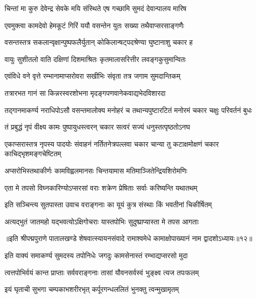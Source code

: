 \twolineshloka
{चिन्तां मा कुरु देवेन्द्र सेवके मयि संस्थिते}
{एष गच्छामि सुमदं देवान्पालय मारिष}%

\twolineshloka
{एवमुक्त्वा कामदेवो हेमकूटं गिरिं ययौ}
{वसन्तेन युतः सख्या तथैवाप्सरसाङ्गणैः}%

\twolineshloka
{वसन्तस्तत्र सकलान्वृक्षान्पुष्पफलैर्युतान्}
{कोकिलान्षट्पदश्रेण्या घुष्टानाशु चकार ह}%

\twolineshloka
{वायुः सुशीतलो वाति दक्षिणां दिशमाश्रितः}
{कृतमालासरित्तीर लवङ्गकुसुमान्वितः}%

\twolineshloka
{एवंविधे वने वृत्ते रम्भानामाप्सरोवरा}
{सखीभिः संवृता तत्र जगाम सुमदान्तिकम्}%

\twolineshloka
{तत्रारभत गानं सा किन्नरस्वरशोभना}
{मृदङ्गपणवानेकवाद्यभेदविशारदा}%

\fourlineindentedshloka
{तद्गानमाकर्ण्य नराधिपोऽसौ}
{वसन्तमालोक्य मनोहरं च}
{तथान्यपुष्टारटितं मनोरमं}
{चकार चक्षुः परिवर्तनं बुधः}%

\twolineshloka
{तं प्रबुद्धं नृपं वीक्ष्य कामः पुष्पायुधस्त्वरन्}
{चकार सत्वरं सज्यं धनुस्तत्पृष्ठतोऽनघ}%

\fourlineindentedshloka
{एकाप्सरास्तत्र नृपस्य पादयोः}
{संवाहनं नर्तितनेत्रपल्लवा}
{चकार चान्या तु कटाक्षमोक्षणं}
{चकार काचिद्भृशमङ्गचेष्टितम्}%

\twolineshloka
{अप्सरोभिस्तथाकीर्णः कामविह्वलमानसः}
{चिन्तयामास मतिमाञ्जितेन्द्रियशिरोमणिः}%

\twolineshloka
{एता मे तपसो विघ्नकारिण्योऽप्सरसां वराः}
{शक्रेण प्रेषिताः सर्वाः करिष्यन्ति यथातथम्}%

\twolineshloka
{इति सञ्चिन्त्य सुतपास्ता उवाच वराङ्गनाः}
{का यूयं कुत्र संस्थाः किं भवतीनां चिकीर्षितम्}%

\twolineshloka
{अत्यद्भुतं जातमहो यद्भवत्योऽक्षिगोचराः}
{यास्तपोभिः सुदुष्प्राप्यास्ता मे तपस आगताः}%

॥इति श्रीपद्मपुराणे पातालखण्डे शेषवात्स्यायनसंवादे रामाश्वमेधे कामाक्षोपाख्यानं नाम द्वादशोऽध्यायः॥१२॥



\twolineshloka
{इति वाक्यं समाकर्ण्य सुमदस्य तपोनिधेः}
{जगदुः कामसेनास्तं रम्भाद्यप्सरसो मुदा}%

\twolineshloka
{त्वत्तपोभिर्वयं कान्त प्राप्ताः सर्ववराङ्गनाः}
{तासां यौवनसर्वस्वं भुङ्क्ष्व त्यज तपःफलम्}%

\twolineshloka
{इयं घृताची सुभगा चम्पकाभशरीरभृत्}
{कर्पूरगन्धललितं भुनक्तु त्वन्मुखामृतम्}%

